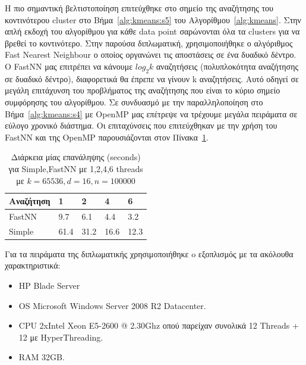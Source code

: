 \indent Η πιο σημαντική βελτιστοποίηση επιτεύχθηκε στο σημείο της αναζήτησης του κοντινότερου cluster στο
Βήμα~\ref{alg:kmeans:s5} του Αλγορίθμου~\ref{alg:kmeans}. Στην απλή εκδοχή του αλγορίθμου για κάθε data point
σαρώνονται όλα τα clusters για να βρεθεί το κοντινότερο. Στην παρούσα διπλωματική, χρησιμοποιήθηκε ο αλγόριθμος
Fast Nearest Neighbour \cite{fastnn} ο οποίος οργανώνει τις αποστάσεις σε ένα δυαδικό δέντρο. Ο FastNN μας επιτρέπει να κάνουμε
$ log_{2} k $  αναζητήσεις (πολυπλοκότητα αναζήτησης σε δυαδικό δέντρο), διαφορετικά θα έπρεπε να γίνουν k αναζητήσεις.
Αυτό οδηγεί σε μεγάλη επιτάχυνση του προβλήματος της αναζήτησης που είναι το κύριο σημείο συμφόρησης του αλγορίθμου. Σε
συνδυασμό με την παραλληλοποίηση στο Βήμα~\ref{alg:kmeans:s4} με OpenMP μας επέτρεψε να τρέχουμε μεγάλα πειράματα σε
εύλογο χρονικό διάστημα. Οι επιταχύνσεις που επιτεύχθηκαν με την χρήση του FastNN και της OpenMP παρουσιάζονται
στον Πίνακα~\ref{table:fastnn}.

\begin{table}[h!]
    \begin{center}
        \begin{tabular}{| l | l | l | l | l |}
        \hline
        Αναζήτηση   & 1     & 2      & 4     & 6    \\ \hline
        FastNN  & 9.7   & 6.1    & 4.4   & 3.2  \\ \hline
        Simple  & 61.4  & 31.2   & 16.6  & 12.3    \\ \hline
        \hline
        \end{tabular}
    \end{center}
    \caption{Διάρκεια μίας επανάληψης (seconds) για Simple,FastNN με 1,2,4,6 threads με $k=65536,d=16,n=100000$}
    \label{table:fastnn}
\end{table}

\newpage

\indent Για τα πειράματα της διπλωματικής χρησιμοποιήθηκε o εξοπλισμός με τα ακόλουθα χαρακτηριστικά:
\begin{itemize}
    \item HP Blade Server
    \item OS Microsoft Windows Server 2008 R2 Datacenter.
    \item CPU 2xIntel Xeon E5-2600 @ 2.30Ghz οπού παρείχαν συνολικά 12 Threads + 12 με HyperThreading.
    \item RAM 32GB.
\end{itemize} 